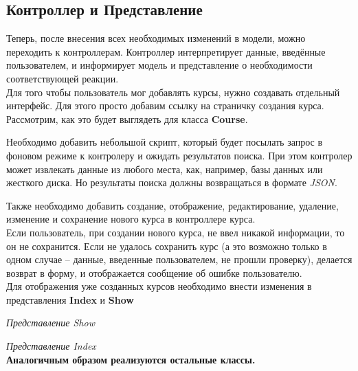 \subsection{Контроллер и Представление}
Теперь, после внесения всех необходимых изменений в модели, можно переходить к контроллерам. Контроллер интерпретирует данные, введённые пользователем, и информирует модель и представление о необходимости соответствующей реакции.\\
\hspace*{0.25cm}Для того чтобы пользователь мог добавлять курсы, нужно создавать отдельный интерфейс. Для этого просто добавим ссылку на страничку создания курса.\\
Рассмотрим, как это будет выглядеть для класса \textbf{Course}.

Необходимо добавить небольшой скрипт, который будет посылать запрос в фоновом режиме к контролеру и ожидать результатов поиска. При этом контролер может извлекать данные из любого места, как, например, базы данных или жесткого диска. Но результаты поиска должны возвращаться  в формате \textit{JSON}.

Также необходимо добавить создание, отображение, редактирование, удаление, изменение и сохранение нового курса в контроллере курса.\\
 
Если пользователь, при создании нового курса, не ввел никакой информации, то он не сохранится. Если не удалось сохранить курс (а это возможно только в одном случае -- данные, введенные пользователем,  не прошли проверку), делается возврат в форму, и отображается сообщение об ошибке пользователю.\\
Для отображения уже созданных курсов необходимо внести изменения в представления \textbf{Index} и \textbf{Show}

\textit{Представление Show}

\textit{Представление Index}\\
\textbf{Аналогичным образом реализуются остальные классы.}
\endinput

